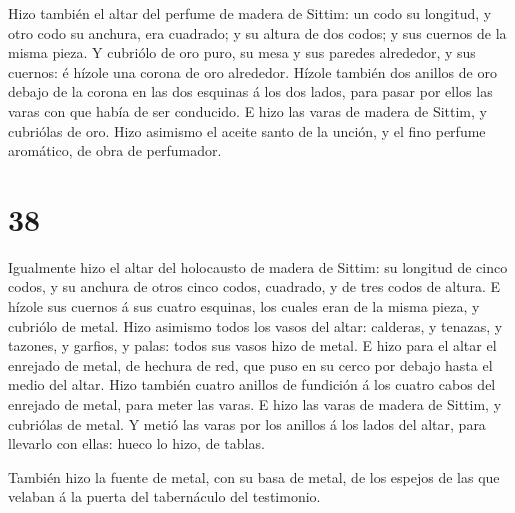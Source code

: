  Hizo también el altar del perfume de madera de Sittim: un
codo su longitud, y otro codo su anchura, era cuadrado; y su altura de
dos codos; y sus cuernos de la misma pieza.  Y cubriólo de
oro puro, su mesa y sus paredes alrededor, y sus cuernos: é hízole una
corona de oro alrededor.  Hízole también dos anillos de oro
debajo de la corona en las dos esquinas á los dos lados, para pasar por
ellos las varas con que había de ser conducido.  E hizo las
varas de madera de Sittim, y cubriólas de oro.  Hizo
asimismo el aceite santo de la unción, y el fino perfume aromático, de
obra de perfumador.

\hypertarget{section-37}{%
\section{38}\label{section-37}}

 Igualmente hizo el altar del holocausto de madera de
Sittim: su longitud de cinco codos, y su anchura de otros cinco codos,
cuadrado, y de tres codos de altura.  E hízole sus cuernos á
sus cuatro esquinas, los cuales eran de la misma pieza, y cubriólo de
metal.  Hizo asimismo todos los vasos del altar: calderas, y
tenazas, y tazones, y garfios, y palas: todos sus vasos hizo de metal.
 E hizo para el altar el enrejado de metal, de hechura de
red, que puso en su cerco por debajo hasta el medio del altar.
 Hizo también cuatro anillos de fundición á los cuatro cabos
del enrejado de metal, para meter las varas.  E hizo las
varas de madera de Sittim, y cubriólas de metal.  Y metió
las varas por los anillos á los lados del altar, para llevarlo con
ellas: hueco lo hizo, de tablas.

 También hizo la fuente de metal, con su basa de metal, de
los espejos de las que velaban á la puerta del tabernáculo del
testimonio.


